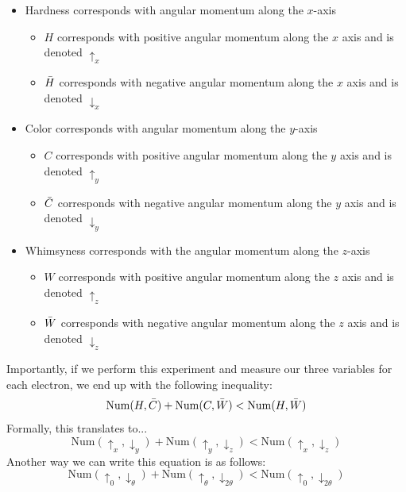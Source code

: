 \documentclass[a4paper]{article}
\begin{document}
\begin{itemize}
    \item Hardness corresponds with angular momentum along the $x$-axis
        \begin{itemize}
            \item $H$ corresponds with positive angular momentum along the $x$ axis and is denoted $\uparrow_x$
            \item $\Bar{H}$ corresponds with negative angular momentum along the $x$ axis and is denoted $\downarrow_x$
        \end{itemize}
    \item Color corresponds with angular momentum along the $y$-axis
        \begin{itemize}
            \item $C$ corresponds with positive angular momentum along the $y$ axis and is denoted $\uparrow_y$
            \item $\Bar{C}$ corresponds with negative angular momentum along the $y$ axis and is denoted $\downarrow_y$
        \end{itemize}
    \item Whimsyness corresponds with the angular momentum along the $z$-axis
        \begin{itemize}
            \item $W$ corresponds with positive angular momentum along the $z$ axis and is denoted $\uparrow_z$
            \item $\Bar{W}$ corresponds with negative angular momentum along the $z$ axis and is denoted $\downarrow_z$
        \end{itemize}
\end{itemize}
Importantly, if we perform this experiment and measure our three variables for each electron, we end up with the following inequality:
\begin{equation}
    \mathrm{Num}(H,\Bar{C}) + \mathrm{Num}(C,\Bar{W}) < \mathrm{Num}(H,\Bar{W})
\end{equation}
Formally, this translates to...
\begin{equation}
    \mathrm{Num}(\uparrow_x,\downarrow_y) + \mathrm{Num}(\uparrow_y,\downarrow_z) < \mathrm{Num}(\uparrow_x,\downarrow_z)
\end{equation}
Another way we can write this equation is as follows:
\begin{equation}
    \mathrm{Num}(\uparrow_0,\downarrow_{\theta}) + \mathrm{Num}(\uparrow_{\theta},\downarrow_{2\theta}) < \mathrm{Num}(\uparrow_0,\downarrow_{2\theta})
\end{equation}
\end{document}

